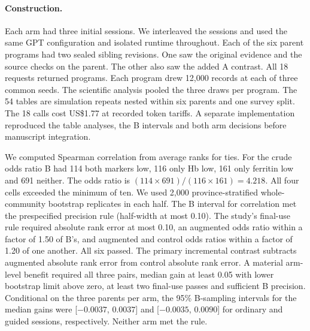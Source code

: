 \paragraph{Construction.}
Each arm had three initial sessions. We interleaved the sessions and used the same GPT configuration and isolated runtime throughout. Each of the six parent programs had two sealed sibling revisions. One saw the original evidence and the source checks on the parent. The other also saw the added A contrast. All 18 requests returned programs. Each program drew 12,000 records at each of three common seeds. The scientific analysis pooled the three draws per program. The 54 tables are simulation repeats nested within six parents and one survey split. The 18 calls cost US\$1.77 at recorded token tariffs. A separate implementation reproduced the table analyses, the B intervals and both arm decisions before manuscript integration.

We computed Spearman correlation from average ranks for ties. For the crude odds ratio B had 114 both markers low, 116 only Hb low, 161 only ferritin low and 691 neither. The odds ratio is $(114\times691)/(116\times161)=4.218$. All four cells exceeded the minimum of ten. We used 2,000 province-stratified whole-community bootstrap replicates in each half. The B interval for correlation met the prespecified precision rule (half-width at most 0.10). The study's final-use rule required absolute rank error at most 0.10, an augmented odds ratio within a factor of 1.50 of B's, and augmented and control odds ratios within a factor of 1.20 of one another. All six passed. The primary incremental contrast subtracts augmented absolute rank error from control absolute rank error. A material arm-level benefit required all three pairs, median gain at least 0.05 with lower bootstrap limit above zero, at least two final-use passes and sufficient B precision. Conditional on the three parents per arm, the 95\% B-sampling intervals for the median gains were [$-0.0037$, $0.0037$] and [$-0.0035$, $0.0090$] for ordinary and guided sessions, respectively. Neither arm met the rule.

